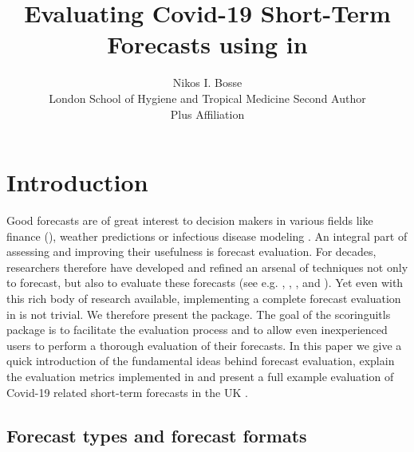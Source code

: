 \documentclass[article,shortnames]{jss}
\author{Nikos I. Bosse\\London School of Hygiene and Tropical Medicine
   \And Second Author\\Plus Affiliation}
\title{Evaluating Covid-19 Short-Term Forecasts using \pkg{scoringutils} in \proglang{R}}
\begin{document}


\section[Introduction]{Introduction}
Good forecasts are of great interest to decision makers in various fields like finance (), weather predictions or infectious disease modeling \citep{funkShorttermForecastsInform2020}. An integral part of assessing and improving their usefulness is forecast evaluation. For decades, researchers therefore have developed and refined an arsenal of techniques not only to forecast, but also to evaluate these forecasts (see e.g. \cite{bracherEvaluatingEpidemicForecasts2020a}, \cite{funkAssessingPerformanceRealtime2019}, \cite{gneitingProbabilisticForecastsCalibration2007}, and \cite{gneitingStrictlyProperScoring2007}). Yet even with this rich body of research available, implementing a complete forecast evaluation in  is not trivial. We therefore present the  package. The goal of the scoringuitls package is to facilitate the evaluation process and to allow even inexperienced users to perform a thorough evaluation of their forecasts. In this paper we give a quick introduction of the fundamental ideas behind forecast evaluation, explain the evaluation metrics implemented in  and present a full example evaluation of Covid-19 related short-term forecasts in the UK \citep{funkShorttermForecastsInform2020}. 

\subsection{Forecast types and forecast formats}
\end{document}
